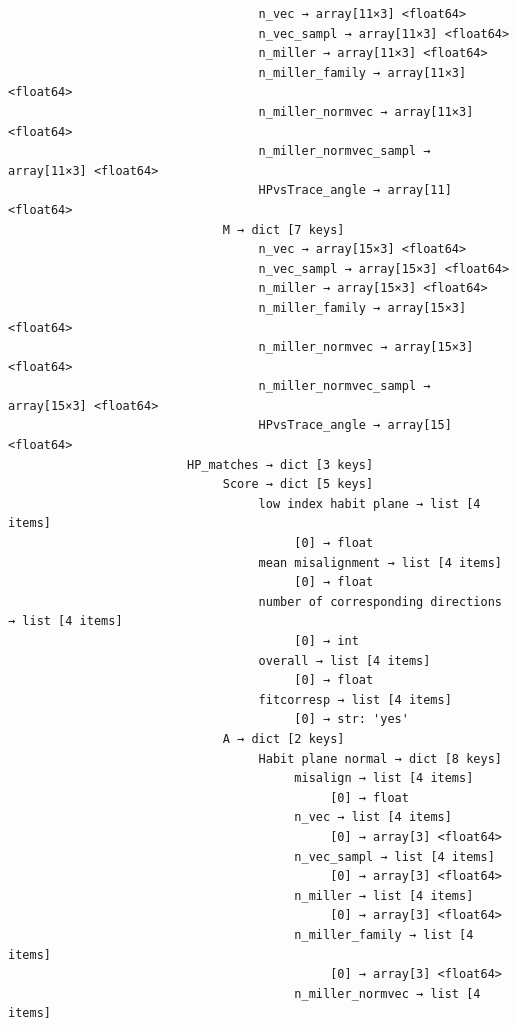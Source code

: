 \documentclass[a4paper,10pt]{article}
\begin{document}
\begin{verbatim}
                                   n_vec → array[11×3] <float64>
                                   n_vec_sampl → array[11×3] <float64>
                                   n_miller → array[11×3] <float64>
                                   n_miller_family → array[11×3] <float64>
                                   n_miller_normvec → array[11×3] <float64>
                                   n_miller_normvec_sampl → array[11×3] <float64>
                                   HPvsTrace_angle → array[11] <float64>
                              M → dict [7 keys]
                                   n_vec → array[15×3] <float64>
                                   n_vec_sampl → array[15×3] <float64>
                                   n_miller → array[15×3] <float64>
                                   n_miller_family → array[15×3] <float64>
                                   n_miller_normvec → array[15×3] <float64>
                                   n_miller_normvec_sampl → array[15×3] <float64>
                                   HPvsTrace_angle → array[15] <float64>
                         HP_matches → dict [3 keys]
                              Score → dict [5 keys]
                                   low index habit plane → list [4 items]
                                        [0] → float
                                   mean misalignment → list [4 items]
                                        [0] → float
                                   number of corresponding directions → list [4 items]
                                        [0] → int
                                   overall → list [4 items]
                                        [0] → float
                                   fitcorresp → list [4 items]
                                        [0] → str: 'yes'
                              A → dict [2 keys]
                                   Habit plane normal → dict [8 keys]
                                        misalign → list [4 items]
                                             [0] → float
                                        n_vec → list [4 items]
                                             [0] → array[3] <float64>
                                        n_vec_sampl → list [4 items]
                                             [0] → array[3] <float64>
                                        n_miller → list [4 items]
                                             [0] → array[3] <float64>
                                        n_miller_family → list [4 items]
                                             [0] → array[3] <float64>
                                        n_miller_normvec → list [4 items]

\end{verbatim}
\end{document}
